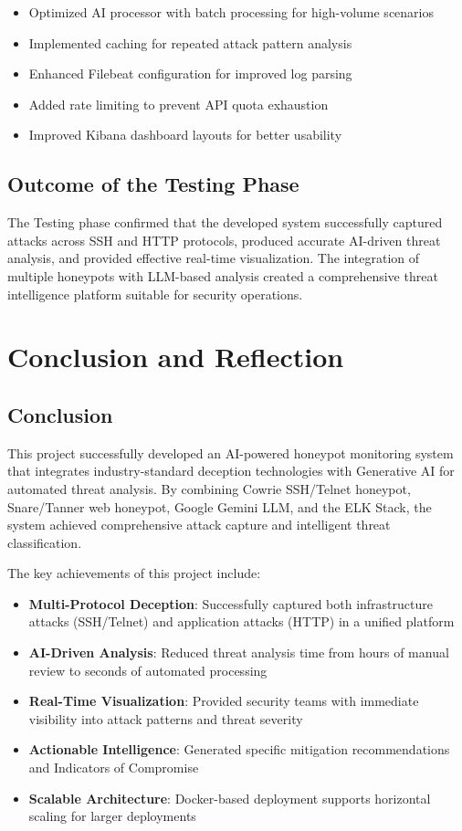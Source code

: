 \documentclass[12pt,a4paper]{report}
\begin{document}
\begin{itemize}
\item Optimized AI processor with batch processing for high-volume scenarios
\item Implemented caching for repeated attack pattern analysis
\item Enhanced Filebeat configuration for improved log parsing
\item Added rate limiting to prevent API quota exhaustion
\item Improved Kibana dashboard layouts for better usability
\end{itemize}

\section{Outcome of the Testing Phase}

The Testing phase confirmed that the developed system successfully captured attacks across SSH and HTTP protocols, produced accurate AI-driven threat analysis, and provided effective real-time visualization. The integration of multiple honeypots with LLM-based analysis created a comprehensive threat intelligence platform suitable for security operations.


\chapter{Conclusion and Reflection}
\thispagestyle{mainpages}

\section{Conclusion}

This project successfully developed an AI-powered honeypot monitoring system that integrates industry-standard deception technologies with Generative AI for automated threat analysis. By combining Cowrie SSH/Telnet honeypot, Snare/Tanner web honeypot, Google Gemini LLM, and the ELK Stack, the system achieved comprehensive attack capture and intelligent threat classification.

The key achievements of this project include:

\begin{itemize}
\item \textbf{Multi-Protocol Deception}: Successfully captured both infrastructure attacks (SSH/Telnet) and application attacks (HTTP) in a unified platform
\item \textbf{AI-Driven Analysis}: Reduced threat analysis time from hours of manual review to seconds of automated processing
\item \textbf{Real-Time Visualization}: Provided security teams with immediate visibility into attack patterns and threat severity
\item \textbf{Actionable Intelligence}: Generated specific mitigation recommendations and Indicators of Compromise
\item \textbf{Scalable Architecture}: Docker-based deployment supports horizontal scaling for larger deployments
\end{itemize}
\end{document}
